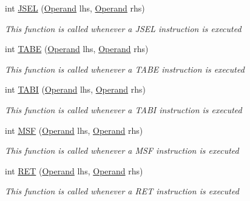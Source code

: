 \begin{DoxyCompactItemize}
int \hyperlink{class_c_p_u___o_s___simulator_1_1_c_p_u_1_1_instruction_a7520a3e1f2d725f93ba07885bcf0c18a}{J\+S\+E\+L} (\hyperlink{class_c_p_u___o_s___simulator_1_1_c_p_u_1_1_operand}{Operand} lhs, \hyperlink{class_c_p_u___o_s___simulator_1_1_c_p_u_1_1_operand}{Operand} rhs)
\begin{DoxyCompactList}\small\item\em This function is called whenever a J\+S\+E\+L instruction is executed \end{DoxyCompactList}\item 
int \hyperlink{class_c_p_u___o_s___simulator_1_1_c_p_u_1_1_instruction_a59b8221570663ee2e1441ff91ae5889c}{T\+A\+B\+E} (\hyperlink{class_c_p_u___o_s___simulator_1_1_c_p_u_1_1_operand}{Operand} lhs, \hyperlink{class_c_p_u___o_s___simulator_1_1_c_p_u_1_1_operand}{Operand} rhs)
\begin{DoxyCompactList}\small\item\em This function is called whenever a T\+A\+B\+E instruction is executed \end{DoxyCompactList}\item 
int \hyperlink{class_c_p_u___o_s___simulator_1_1_c_p_u_1_1_instruction_ad109930f205c2f7ac66e1316a10b3059}{T\+A\+B\+I} (\hyperlink{class_c_p_u___o_s___simulator_1_1_c_p_u_1_1_operand}{Operand} lhs, \hyperlink{class_c_p_u___o_s___simulator_1_1_c_p_u_1_1_operand}{Operand} rhs)
\begin{DoxyCompactList}\small\item\em This function is called whenever a T\+A\+B\+I instruction is executed \end{DoxyCompactList}\item 
int \hyperlink{class_c_p_u___o_s___simulator_1_1_c_p_u_1_1_instruction_aff22a323b65122eb9b73424f16b489c5}{M\+S\+F} (\hyperlink{class_c_p_u___o_s___simulator_1_1_c_p_u_1_1_operand}{Operand} lhs, \hyperlink{class_c_p_u___o_s___simulator_1_1_c_p_u_1_1_operand}{Operand} rhs)
\begin{DoxyCompactList}\small\item\em This function is called whenever a M\+S\+F instruction is executed \end{DoxyCompactList}\item 
int \hyperlink{class_c_p_u___o_s___simulator_1_1_c_p_u_1_1_instruction_a64f544c104bb6e898653522aeee5fe8a}{R\+E\+T} (\hyperlink{class_c_p_u___o_s___simulator_1_1_c_p_u_1_1_operand}{Operand} lhs, \hyperlink{class_c_p_u___o_s___simulator_1_1_c_p_u_1_1_operand}{Operand} rhs)
\begin{DoxyCompactList}\small\item\em This function is called whenever a R\+E\+T instruction is executed \end{DoxyCompactList}\item 

\end{DoxyCompactItemize}
